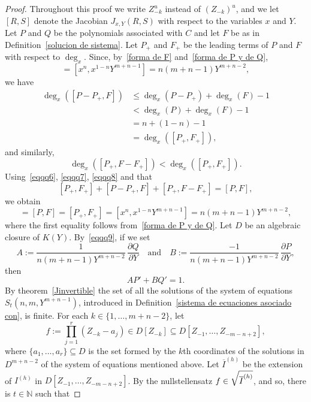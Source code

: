 \documentclass[reqno,a4paper]{amsart}
\theoremstyle{definition}
\theoremstyle{remark}
\newcommand{\ov}{\overline}
\begin{document}
\begin{proof} Throughout this proof we write $Z_{-k}^u$ instead of $(Z_{-k})^u$, and we let
$[R,S]$ denote the Jacobian $J_{x,Y}(R,S)$ with respect to the variables $x$ and $Y$. Let $P$
and $Q$ be the polynomials associated with $C$ and let $F$ be as in
Definition~\ref{solucion de sistema}. Let $P_+$ and $F_+$ be the leading terms of $P$ and $F$
with respect to $\deg_x$. Since, by~\eqref{forma de F} and~\eqref{forma de P y de Q},
\begin{equation}
[P_+,F_+] = [x^n,x^{1-n}Y^{m+n-1}] = n(m+n-1)Y^{m+n-2},\label{eqqq6}
\end{equation}
we have
\begin{equation}
\begin{aligned}
\deg_x([P-P_+,F])&\le \deg_x(P-P_+) + \deg_x(F) - 1\\
%
& < \deg_x(P) + \deg_x(F) - 1\\
%
& = n + (1-n) -1\\
%
& = \deg_x([P_+,F_+]),
\end{aligned}\label{eqqq7}
\end{equation}
and similarly,
\begin{equation}
\deg_x([P_+,F-F_+]) < \deg_x([P_+,F_+]).\label{eqqq8}
\end{equation}
Using~\eqref{eqqq6}, \eqref{eqqq7}, \eqref{eqqq8} and that
$$
[P_+,F_+] + [P-P_+,F] + [P_+,F-F_+] = [P,F],
$$
we obtain
\begin{equation}
[P,Q] = [P,F] = [P_+,F_+] = [x^n,x^{1-n}Y^{m+n-1}] = n(m+n-1)Y^{m+n-2},\label{eqqq9}
\end{equation}
where the first equality follows from~\eqref{forma de P y de Q}. Let $D$ be an algebraic closure of $K(Y)$.
By~\eqref{eqqq9}, if we set
$$
A := \frac{1}{n(m+n-1)Y^{m+n-2}}\,\frac{\partial Q}{\partial Y}\quad \text{and}\quad
B:=\frac{-1}{n(m+n-1) Y^{m+n-2}}\,\frac{\partial P}{\partial Y},
$$
then
$$
A P' + B Q' = 1.
$$
By theorem~\ref{Jinvertible} the set of all the solutions of the system of equations
$S_t(n,m,Y^{m+n-1})$, introduced in Definition~\ref{sistema de ecuaciones asociado con},
is finite. For each $k\in \{1,\dots,m+n-2\}$, let
$$
f:=\prod_{j=1}^r (Z_{-k}-a_j)\in D[Z_{-k}]\subseteq D[Z_{-1},\dots,Z_{-m-n+2}],
$$
where $\{a_1,\dots,a_r\}\subseteq D$ is the set formed by the $k$th coordinates of the
solutions in $D^{m+n-2}$ of the system of equations mentioned above. Let $\ov{I}^{(h)}$
be the extension of $I^{(h)}$ in $D[Z_{-1},\dots,Z_{-m-n+2}]$. By the nullstellensatz
$\cramped{f\in \sqrt{\ov I^{(h)}}}$, and so, there is $t\in \mathds{N}$ such that

\end{proof}
\end{document}

